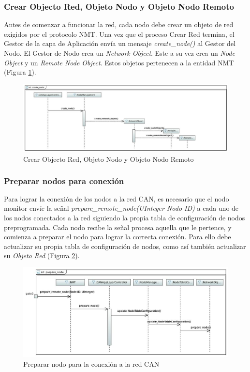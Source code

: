 \subsubsection{Crear Objecto Red, Objeto Nodo y Objeto Nodo Remoto}
Antes de comenzar a funcionar la red, cada nodo debe crear un objeto de red
exigidos por el protocolo NMT. Una vez que el proceso Crear Red termina,
el Gestor de la capa de Aplicación envía un mensaje \textit{create\_node()}
al Gestor del Nodo. El Gestor de Nodo crea un \textit{Network Object}. Este a su
vez crea un \textit{Node Object} y un \textit{Remote Node Object}. Estos objetos
pertenecen a la entidad NMT (Figura \ref{fig:CreateNode}).

\begin{figure}[h!]
 \centering
 \includegraphics[scale=0.4]{images/Secciones/AppendixA/create_node.JPG}
  \caption{Crear Objecto Red, Objeto Nodo y Objeto Nodo Remoto}
  \label{fig:CreateNode}
\end{figure}

\subsubsection{Preparar nodos para conexión}
Para lograr la conexión de los nodos a la red CAN, es necesario que el nodo
monitor envíe la señal \textit{prepare\_remote\_node(UInteger Nodo-ID)} a
cada uno de los nodos conectados a la red siguiendo la propia tabla de
configuración de nodos preprogramada. Cada nodo recibe la señal procesa aquella
que le pertence, y comienza a preparar el nodo para lograr la correcta conexión.
Para ello debe actualizar su propia tabla de configuración de nodos, como así
también actualizar su \textit{Objeto Red} (Figura \ref{fig:PrepareNode}).

\begin{figure}[h!]
 \centering
 \includegraphics[scale=0.4]{images/Secciones/AppendixA/PrepareNode.JPG}
  \caption{Preparar nodo para la conexión a la red CAN}
  \label{fig:PrepareNode}
\end{figure}


